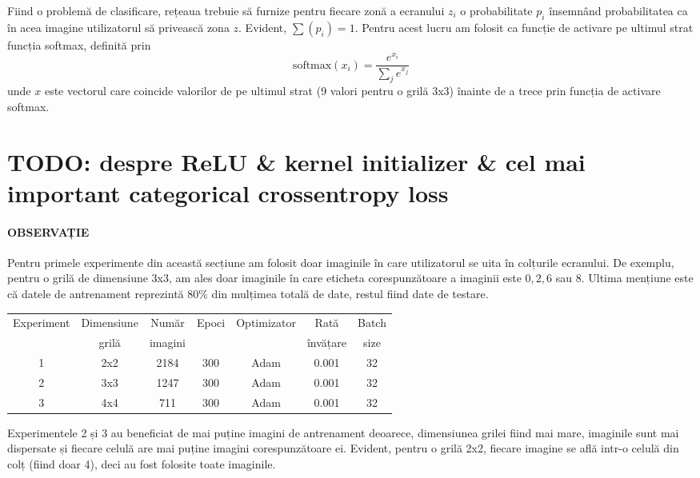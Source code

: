 Fiind o problemă de clasificare, rețeaua trebuie să furnize pentru fiecare zonă a ecranului $z_i$ o probabilitate $p_i$ însemnând probabilitatea ca în acea imagine utilizatorul să privească zona $z$.
Evident, $\sum(p_i) = 1$.
Pentru acest lucru am folosit ca funcție de activare pe ultimul strat funcția softmax, definită prin
$$
\text{softmax}(x_i) = \frac{e^{x_i}}{\sum_j{e^{x_j}}}
$$
unde $x$ este vectorul care coincide valorilor de pe ultimul strat (9 valori pentru o grilă 3x3) înainte de a trece prin funcția de activare softmax.

\section{TODO: despre ReLU \& kernel initializer \& cel mai important categorical crossentropy loss}

\paragraph{OBSERVAȚIE}
Pentru primele experimente din această secțiune am folosit doar imaginile în care utilizatorul se uita în colțurile ecranului.
De exemplu, pentru o grilă de dimensiune 3x3, am ales doar imaginile în care eticheta corespunzătoare a imaginii este $0, 2, 6$ sau $8$.
Ultima mențiune este că datele de antrenament reprezintă $80\%$ din mulțimea totală de date, restul fiind date de testare.

\begin{center}
    \begin{tabular}{ c | c | c | c | c | c | c }
        \hline
        Experiment & Dimensiune & Număr   & Epoci & Optimizator & Rată     & Batch \\ 
                   & grilă      & imagini &       &             & învățare & size  \\ 
        \hline
        1 & 2x2 & 2184 & 300 & Adam & 0.001 & 32 \\
        \hline
        2 & 3x3 & 1247 & 300 & Adam & 0.001 & 32 \\
        \hline
        3 & 4x4 & 711 & 300 & Adam & 0.001 & 32 \\
        \hline
    \end{tabular}
\end{center}

Experimentele 2 și 3 au beneficiat de mai puține imagini de antrenament deoarece, dimensiunea grilei fiind mai mare, imaginile sunt mai dispersate și fiecare celulă are mai puține imagini corespunzătoare ei.
Evident, pentru o grilă 2x2, fiecare imagine se află intr-o celulă din colț (fiind doar 4), deci au fost folosite toate imaginile.

